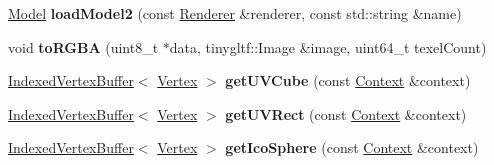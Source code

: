 \begin{DoxyCompactItemize}
\item 
\mbox{\label{namespaceblaze_a630888b7c86cb756724d004a91cda8b2}} 
\hyperlink{classblaze_1_1Model}{Model} {\bfseries load\+Model2} (const \hyperlink{classblaze_1_1Renderer}{Renderer} \&renderer, const std\+::string \&name)
\item 
\mbox{\label{namespaceblaze_a174ec85e4f8fcf5a02ebb0e46afd7aaf}} 
void {\bfseries to\+R\+G\+BA} (uint8\+\_\+t $\ast$data, tinygltf\+::\+Image \&image, uint64\+\_\+t texel\+Count)
\item 
\mbox{\label{namespaceblaze_a3ed17c7daa6571534924e60b1486ef4b}} 
\hyperlink{classblaze_1_1IndexedVertexBuffer}{Indexed\+Vertex\+Buffer}$<$ \hyperlink{structblaze_1_1Vertex}{Vertex} $>$ {\bfseries get\+U\+V\+Cube} (const \hyperlink{classblaze_1_1Context}{Context} \&context)
\item 
\mbox{\label{namespaceblaze_a1f9e6721673d2760d4c29d1279bd3b39}} 
\hyperlink{classblaze_1_1IndexedVertexBuffer}{Indexed\+Vertex\+Buffer}$<$ \hyperlink{structblaze_1_1Vertex}{Vertex} $>$ {\bfseries get\+U\+V\+Rect} (const \hyperlink{classblaze_1_1Context}{Context} \&context)
\item 
\mbox{\label{namespaceblaze_ad7b945c1978ea8073eb0d5d90b0f8d7f}} 
\hyperlink{classblaze_1_1IndexedVertexBuffer}{Indexed\+Vertex\+Buffer}$<$ \hyperlink{structblaze_1_1Vertex}{Vertex} $>$ {\bfseries get\+Ico\+Sphere} (const \hyperlink{classblaze_1_1Context}{Context} \&context)
\end{DoxyCompactItemize}
